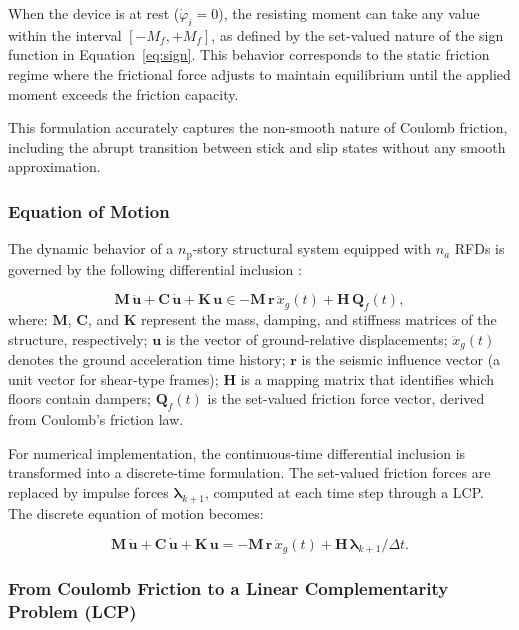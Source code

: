 \documentclass[preprint,12pt,authoryear]{elsarticle}
\newcommand{\np}{n_{\mathrm{p}}}
\newcommand{\Mf}{M_{\!f}}
\begin{document}
When the device is at rest ($\dot{\varphi}_i = 0$), the resisting moment can take any value within the interval $[-\Mf, +\Mf]$, as defined by the set-valued nature of the sign function in Equation~\eqref{eq:sign}. This behavior corresponds to the static friction regime where the frictional force adjusts to maintain equilibrium until the applied moment exceeds the friction capacity.

This formulation accurately captures the non-smooth nature of Coulomb friction, including the abrupt transition between stick and slip states without any smooth approximation.

\subsubsection{Equation of Motion}
\label{sec:theory:eom}

The dynamic behavior of a $\np$-story structural system equipped with $n_a$ RFDs is governed by the following differential inclusion \citep{Namorado2022}:

\begin{equation}
	\bm{M}\,\ddot{\bm{u}} + \bm{C}\,\dot{\bm{u}} + \bm{K}\,\bm{u}
	\in -\bm{M}\,\bm{r}\,\ddot{x}_g(t) + \bm{H}\,\bm{Q}_f(t),
	\label{eq:eom}
\end{equation}
where: $\bm{M}$, $\bm{C}$, and $\bm{K}$ represent the mass, damping, and stiffness matrices of the structure, respectively; $\bm{u}$ is the vector of ground-relative displacements; $\ddot{x}_g(t)$ denotes the ground acceleration time history; $\bm{r}$ is the seismic influence vector (a unit vector for shear-type frames); $\bm{H}$ is a mapping matrix that identifies which floors contain dampers; $\bm{Q}_f(t)$ is the set-valued friction force vector, derived from Coulomb's friction law.

For numerical implementation, the continuous-time differential inclusion is transformed into a discrete-time formulation. The set-valued friction forces are replaced by impulse forces $\bm{\lambda}_{k+1}$, computed at each time step through a LCP. The discrete equation of motion becomes:

\begin{equation}
	\bm{M}\,\ddot{\bm{u}} + \bm{C}\,\dot{\bm{u}} + \bm{K}\,\bm{u}
	= -\bm{M}\,\bm{r}\,\ddot{x}_g(t) + \bm{H}\,\bm{\lambda}_{k+1}/\Delta t.
	\label{eq:eom_disc}
\end{equation}

\subsubsection{From Coulomb Friction to a Linear Complementarity Problem (LCP)}
\label{sec:theory:lcp}
\end{document}
